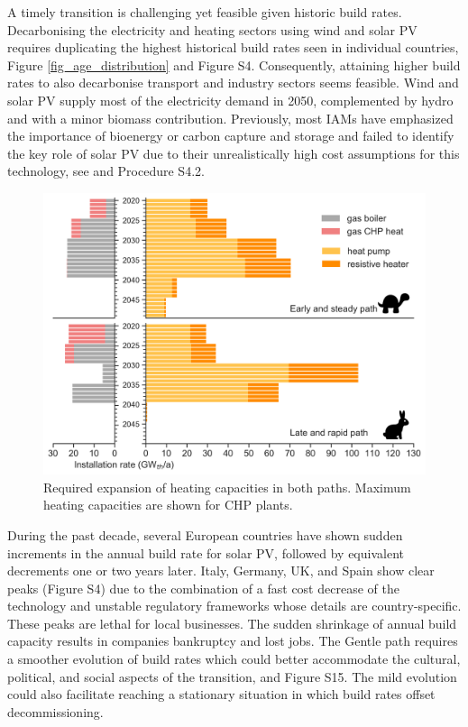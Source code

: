\documentclass[5p]{elsarticle} %
\begin{document}
A timely transition is challenging yet feasible given historic build rates. Decarbonising the electricity and heating sectors using wind and solar PV requires duplicating the highest historical build rates seen in individual countries, Figure \ref{fig_age_distribution} and Figure S4. Consequently, attaining higher build rates to also decarbonise transport and industry sectors seems feasible. Wind and solar PV supply most of the electricity demand in 2050, complemented by hydro and with a minor biomass contribution. Previously, most IAMs have emphasized the importance of bioenergy or carbon capture and storage and failed to identify the key role of solar PV due to their unrealistically high cost assumptions for this technology, see \cite{Creutzig_2017, Krey_2019} and Procedure S4.2. \\

\begin{figure}[!h]
\centering
\includegraphics[width=\columnwidth]{../figures/heating_expansion_Base.png}
\caption{Required expansion of heating capacities in both paths. Maximum heating capacities are shown for CHP plants.} \label{fig_heating_expansion} 
\end{figure}

During the past decade, several European countries have shown sudden increments in the annual build rate for solar PV, followed by equivalent decrements one or two years later. Italy, Germany, UK, and Spain show clear peaks (Figure S4)  due to the combination of a fast cost decrease of the technology and unstable regulatory frameworks whose details are country-specific. These peaks are lethal for local businesses. The sudden shrinkage of annual build capacity results in companies bankruptcy and lost jobs. The Gentle path requires a smoother evolution of build rates which could better accommodate the cultural, political, and social aspects of the transition, \cite{Geels_2017} and Figure S15. The mild evolution could also facilitate reaching a stationary situation in which build rates offset decommissioning. \\ 
\end{document}
